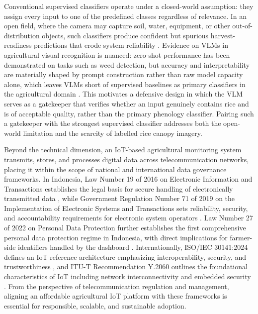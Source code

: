 Conventional supervised classifiers operate under a closed-world assumption: they assign every input to one of the predefined classes regardless of relevance. In an open field, where the camera may capture soil, water, equipment, or other out-of-distribution objects, such classifiers produce confident but spurious harvest-readiness predictions that erode system reliability \cite{geng2021openset}. Evidence on VLMs in agricultural visual recognition is nuanced: zero-shot performance has been demonstrated on tasks such as weed detection, but accuracy and interpretability are materially shaped by prompt construction rather than raw model capacity alone, which leaves VLMs short of supervised baselines as primary classifiers in the agricultural domain \cite{frontiers2026weedvlm}. This motivates a defensive design in which the VLM serves as a gatekeeper that verifies whether an input genuinely contains rice and is of acceptable quality, rather than the primary phenology classifier. Pairing such a gatekeeper with the strongest supervised classifier addresses both the open-world limitation and the scarcity of labelled rice canopy imagery.

Beyond the technical dimension, an IoT-based agricultural monitoring system transmits, stores, and processes digital data across telecommunication networks, placing it within the scope of national and international data governance frameworks. In Indonesia, Law Number 19 of 2016 on Electronic Information and Transactions establishes the legal basis for secure handling of electronically transmitted data \cite{uuite2016}, while Government Regulation Number 71 of 2019 on the Implementation of Electronic Systems and Transactions sets reliability, security, and accountability requirements for electronic system operators \cite{pp71_2019}. Law Number 27 of 2022 on Personal Data Protection further establishes the first comprehensive personal data protection regime in Indonesia, with direct implications for farmer-side identifiers handled by the dashboard \cite{uupdp2022}. Internationally, ISO/IEC 30141:2024 defines an IoT reference architecture emphasizing interoperability, security, and trustworthiness \cite{iso30141_2024}, and ITU-T Recommendation Y.2060 outlines the foundational characteristics of IoT including network interconnectivity and embedded security \cite{itut_y2060}. From the perspective of telecommunication regulation and management, aligning an affordable agricultural IoT platform with these frameworks is essential for responsible, scalable, and sustainable adoption.


